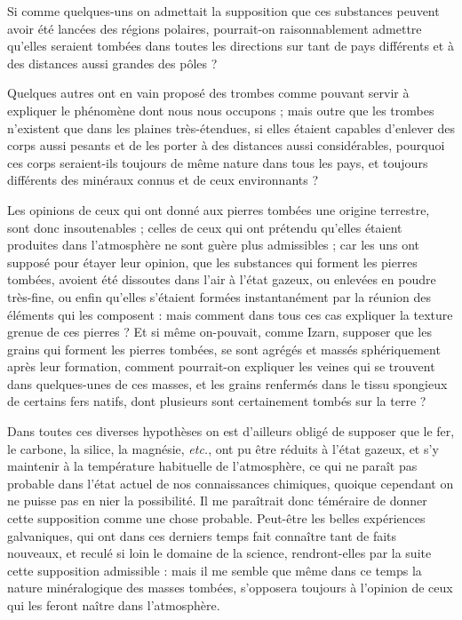 \documentclass[a4paper, 12pt, oneside, french]{article}
\begin{document}
Si comme quelques-uns on admettait la supposition que ces substances peuvent avoir été lancées des régions polaires, pourrait-on raisonnablement admettre qu'elles seraient tombées dans toutes les directions sur tant de pays différents et à des distances aussi grandes des pôles ?

Quelques autres ont en vain proposé des trombes comme pouvant servir à expliquer le phénomène dont nous nous occupons ; mais outre que les trombes n'existent que dans les plaines très-étendues, si elles étaient capables d'enlever des corps aussi pesants et de les porter à des distances aussi considérables, pourquoi ces corps seraient-ils toujours de même nature dans tous les pays, et toujours différents des minéraux connus et de ceux environnants ?

Les opinions de ceux qui ont donné aux pierres tombées une origine terrestre, sont donc insoutenables ; celles de ceux qui ont prétendu qu'elles étaient produites dans l'atmosphère ne sont guère plus admissibles ; car les uns ont supposé pour étayer leur opinion, que les substances qui forment les pierres tombées, avoient été dissoutes dans l'air à l'état gazeux, ou enlevées en poudre très-fine, ou enfin qu'elles s'étaient formées instantanément par la réunion des éléments qui les composent : mais comment dans tous ces cas expliquer la texture grenue de ces pierres ? Et si même on-pouvait, comme Izarn, supposer que les grains qui forment les pierres tombées, se sont agrégés et massés sphériquement après leur formation, comment pourrait-on expliquer les veines qui se trouvent dans quelques-unes de ces masses, et les grains renfermés dans le tissu spongieux de certains fers natifs, dont plusieurs sont certainement tombés sur la terre ?

Dans toutes ces diverses hypothèses on est d'ailleurs obligé de supposer que le fer, le carbone, la silice, la magnésie, \emph{etc.}, ont pu être réduits à l'état gazeux, et s'y maintenir à la température habituelle de l'atmosphère, ce qui ne paraît pas probable dans l'état actuel de nos connaissances chimiques, quoique cependant on ne puisse pas en nier la possibilité. Il me paraîtrait donc téméraire de donner cette supposition comme une chose probable. Peut-être les belles expériences galvaniques, qui ont dans ces derniers temps fait connaître tant de faits nouveaux, et reculé si loin le domaine de la science, rendront-elles par la suite cette supposition admissible : mais il me semble que même dans ce temps la nature minéralogique des masses tombées, s'opposera toujours à l'opinion de ceux qui les feront naître dans l'atmosphère.
\end{document}
